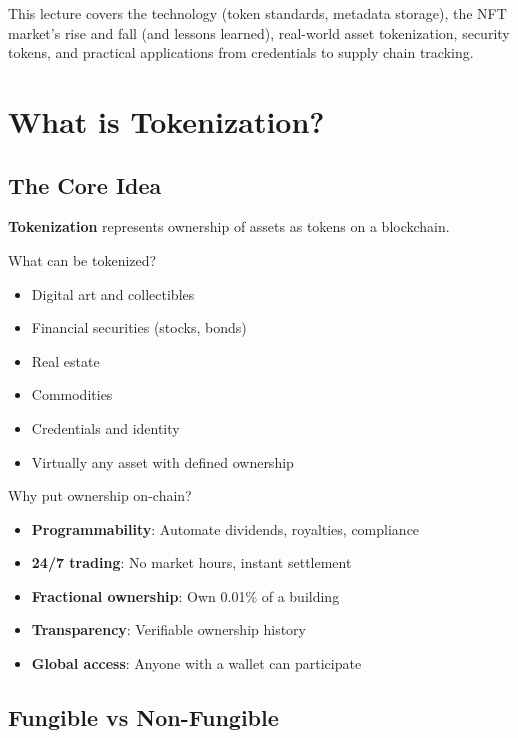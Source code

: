 \documentclass[11pt,a4paper]{article}
\newcommand{\keyword}[1]{\textbf{\textcolor{AccentOrange}{#1}}}
\begin{document}
This lecture covers the technology (token standards, metadata storage), the NFT market's rise and fall (and lessons learned), real-world asset tokenization, security tokens, and practical applications from credentials to supply chain tracking.

\section{What is Tokenization?}

\subsection{The Core Idea}

\keyword{Tokenization} represents ownership of assets as tokens on a blockchain.

What can be tokenized?
\begin{itemize}
    \item Digital art and collectibles
    \item Financial securities (stocks, bonds)
    \item Real estate
    \item Commodities
    \item Credentials and identity
    \item Virtually any asset with defined ownership
\end{itemize}

Why put ownership on-chain?
\begin{itemize}
    \item \textbf{Programmability}: Automate dividends, royalties, compliance
    \item \textbf{24/7 trading}: No market hours, instant settlement
    \item \textbf{Fractional ownership}: Own 0.01\% of a building
    \item \textbf{Transparency}: Verifiable ownership history
    \item \textbf{Global access}: Anyone with a wallet can participate
\end{itemize}

\subsection{Fungible vs Non-Fungible}
\end{document}
